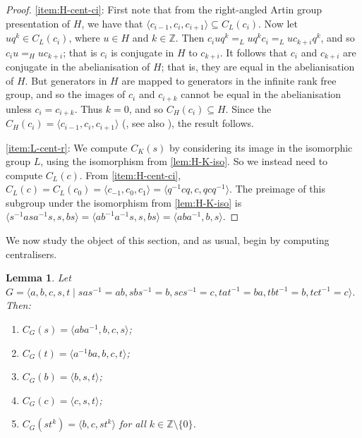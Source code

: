 \documentclass[11pt]{amsart}
\newtheorem{lem}[theorem]{Lemma}
\theoremstyle{definition}
\numberwithin{theorem}{section}
\newcommand{\Z}{\mathbb{Z}}
\begin{document}
\begin{proof}
    \eqref{item:H-cent-ci}: First note that from
	the right-angled Artin group presentation of \(H\), we have that \(\langle
	c_{i-1}, c_{i}, c_{i + 1} \rangle \subseteq C_L(c_i)\). Now let \(u q^k \in
	C_L(c_i)\), where \(u \in H\) and \(k \in \mathbb{Z}\). Then \(c_i
	uq^k =_L uq^k c_i =_L uc_{k + i} q^k\), and so \(c_i u =_{H} u c_{k
	+ i}\); that is \(c_i\) is conjugate in \(H\) to \(c_{k + i}\). It
	follows that \(c_i\) and \(c_{k + i}\) are conjugate in the abelianisation
	of \(H\); that is, they are equal in the abelianisation of \(H\). But
	generators in \(H\) are mapped to generators in the infinite rank
	free group, and so the images of \(c_i\) and \(c_{i + k}\) cannot be equal
	in the abelianisation unless \(c_i = c_{i + k}\). Thus \(k = 0\), and so
	\(C_H(c_i) \subseteq H\). Since the \(C_{H}(c_i) = \langle
	c_{i - 1}, c_i, c_{i + 1} \rangle\) (\cite[The Centralizer Theorem]{Servatius89}, see also \cite[Proposition 2.1]{DayWade19}), the result follows.

        \eqref{item:L-cent-r}: We compute \(C_K(s)\) by considering its image in
    the isomorphic group \(L\), using the isomorphism from \cref{lem:H-K-iso}.
    So we instead need to compute \(C_L(c)\). From \eqref{item:H-cent-ci},
    \(C_L(c) = C_L(c_0) = \langle c_{-1}, c_0, c_1 \rangle = \langle
    q^{-1}cq, c, qcq^{-1} \rangle\). The preimage of this subgroup under the
    isomorphism from \cref{lem:H-K-iso} is \(\langle s^{-1} a s a^{-1} s,
    s, bs \rangle = \langle a b^{-1} a^{-1}s, s, bs \rangle =
    \langle aba^{-1}, b, s \rangle\).
\end{proof}

	We now study the object of this section, and as usual, begin by computing
	centralisers. 

	\begin{lem}
		\label{F2byF2-cents}
		Let \(G = \langle a, b,c, s, t \mid sas^{-1} = ab, sbs^{-1} = b, scs^{-1} = c, tat^{-1} = ba,
		tbt^{-1} = b, tct^{-1} = c \rangle\). Then:
		\begin{enumerate}
				\item \(C_G(s) = \langle aba^{-1}, b, c, s \rangle\);
				\label{item:F2byF2-cent-s}
				\item \(C_G(t) = \langle a^{-1} ba, b, c, t \rangle\);
				\label{item:F2byF2-cent-t}
				\item \(C_G(b) = \langle b, s, t \rangle\);
						\label{item:F2byF2-cent-b}
				\item \(C_G(c) = \langle c, s, t \rangle\);
						\label{item:F2byF2-cent-c}
				\item \(C_G(st^k) = \langle b, c, st^k \rangle\) for all \(k \in \Z \setminus \{0\}\).
						\label{item:F2byF2-cent-stk}
		\end{enumerate}
	\end{lem}
	
\end{document}
